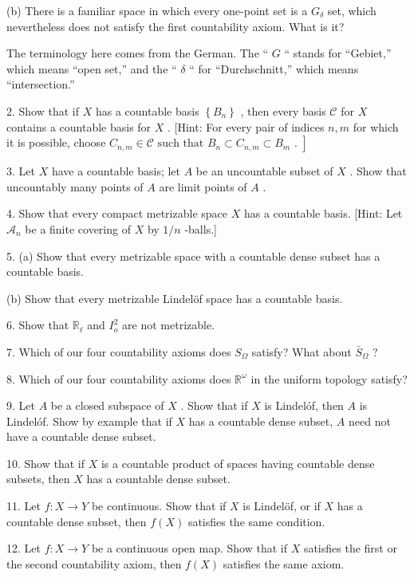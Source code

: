 (b) There is a familiar space in which every one-point set is a \({G}_{\delta }\) set, which nevertheless does not satisfy the first countability axiom. What is it?

The terminology here comes from the German. The `` \(G\) `` stands for ``Gebiet,'' which means ``open set,'' and the `` \(\delta\) `` for ``Durchschnitt,'' which means ``intersection.''

2. Show that if \(X\) has a countable basis \(\left\{  {B}_{n}\right\}\) , then every basis \(\mathcal{C}\) for \(X\) contains a countable basis for \(X\) . [Hint: For every pair of indices \(n,m\) for which it is possible, choose \(\left. {{C}_{n,m} \in  \mathcal{C}\text{ such that }{B}_{n} \subset  {C}_{n,m} \subset  {B}_{m}\text{ . }}\right\rbrack\)

3. Let \(X\) have a countable basis; let \(A\) be an uncountable subset of \(X\) . Show that uncountably many points of \(A\) are limit points of \(A\) .

4. Show that every compact metrizable space \(X\) has a countable basis. [Hint: Let \({\mathcal{A}}_{n}\) be a finite covering of \(X\) by \(1/n\) -balls.]

5. (a) Show that every metrizable space with a countable dense subset has a countable basis.

(b) Show that every metrizable Lindelöf space has a countable basis.

6. Show that \({\mathbb{R}}_{\ell }\) and \({I}_{o}^{2}\) are not metrizable.

7. Which of our four countability axioms does \({S}_{\Omega }\) satisfy? What about \({\bar{S}}_{\Omega }\) ?

8. Which of our four countability axioms does \({\mathbb{R}}^{\omega }\) in the uniform topology satisfy?

9. Let \(A\) be a closed subspace of \(X\) . Show that if \(X\) is Lindelóf, then \(A\) is Lindelóf. Show by example that if \(X\) has a countable dense subset, \(A\) need not have a countable dense subset.

10. Show that if \(X\) is a countable product of spaces having countable dense subsets, then \(X\) has a countable dense subset.

11. Let \(f : X \rightarrow  Y\) be continuous. Show that if \(X\) is Lindelöf, or if \(X\) has a countable dense subset, then \(f\left( X\right)\) satisfies the same condition.

12. Let \(f : X \rightarrow  Y\) be a continuous open map. Show that if \(X\) satisfies the first or the second countability axiom, then \(f\left( X\right)\) satisfies the same axiom.

